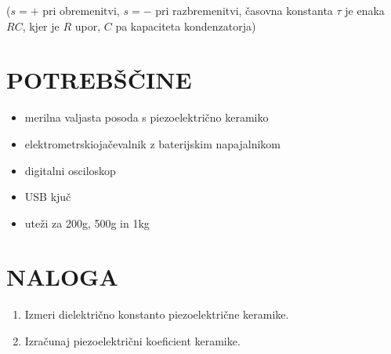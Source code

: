 \documentclass[12pt,a4paper]{article}
\begin{document}
($s = +$ pri obremenitvi, $s = -$ pri razbremenitvi, časovna konstanta $\tau$ je enaka $RC$, kjer je $R$ upor, $C$ pa kapaciteta kondenzatorja)

\section{POTREBŠČINE}

\begin{itemize}
	\item merilna valjasta posoda s piezoelektrično keramiko
	\item elektrometrskiojačevalnik z baterijskim napajalnikom
	\item digitalni osciloskop
	\item USB kjuč
	\item uteži za 200g, 500g in 1kg 
\end{itemize}

\section{NALOGA}

\begin{enumerate}
	\item Izmeri dielektrično konstanto piezoelektrične keramike.
	\item Izračunaj piezoelektrični koeficient keramike.
\end{enumerate}
\end{document}
